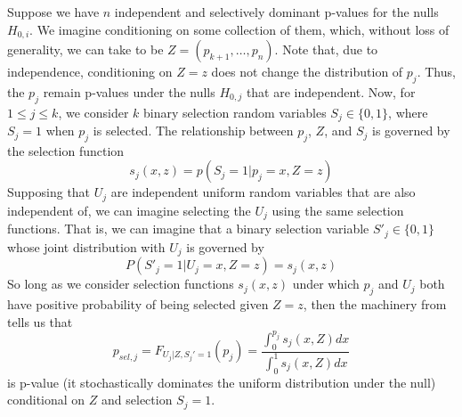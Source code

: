 \documentclass{article}
\begin{document}
\begin{appendix}
Suppose we have $n$ independent and selectively dominant p-values for the nulls $H_{0, i}$. We imagine conditioning on some collection of them, which, without loss of generality, we can take to be $Z = (p_{k+1}, \dots, p_n)$. Note that, due to independence, conditioning on $Z = z$ does not change the distribution of $p_j$. Thus, the $p_j$ remain p-values under the nulls $H_{0, j}$ that are independent. Now, for $1 \leq j \leq k$, we consider $k$ binary selection random variables $S_j \in \{0, 1\}$, where $S_j = 1$ when $p_j$ is selected. The relationship between $p_j$, $Z$, and $S_j$ is governed by the selection function 
\begin{equation*}
    s_j(x, z) = p(S_j = 1 | p_j = x, Z=z)
\end{equation*} 
Supposing that $U_j$ are independent uniform random variables that are also independent of, we can imagine selecting the $U_j$ using the same selection functions. That is, we can imagine that a binary selection variable $S'_j \in \{0, 1\}$ whose joint distribution with $U_j$ is governed by 
\begin{equation*}
    P(S'_j = 1| U_j = x, Z = z) = s_j(x, z)
\end{equation*}
So long as we consider selection functions $s_j(x, z)$ under which $p_j$ and $U_j$ both have positive probability of being selected given $Z=z$, then the machinery from  tells us that 
\begin{equation*}
    p_{sel, j} = F_{U_j |Z, S_j' = 1}(p_j) = \frac{\int_0^{p_j} s_j(x, Z)dx }{\int_0^1 s_j(x, Z)dx}
\end{equation*}
is p-value (it stochastically dominates the uniform distribution under the null) conditional on $Z$ and selection $S_j = 1$. 


\end{appendix}
\end{document}
